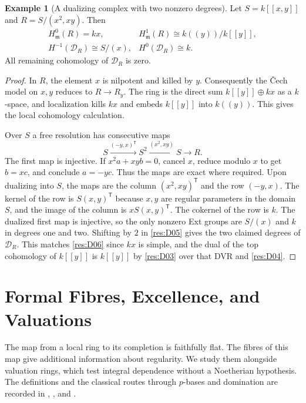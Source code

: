 \documentclass[11pt,oneside,openany]{book}
\theoremstyle{definition}
\newtheorem{example}[theorem]{Example}
\theoremstyle{remark}
\begin{document}
\begin{example}[A dualizing complex with two nonzero degrees]\label{res:E04}
Let $S=k[[x,y]]$ and $R=S/(x^2,xy)$. Then
\[
 \begin{array}{ll}
 H^0_{\mathfrak m}(R)=kx, &
 H^1_{\mathfrak m}(R)\cong k((y))/k[[y]],\\[2pt]
 H^{-1}(\mathcal D_R)\cong S/(x), &
 H^0(\mathcal D_R)\cong k .
 \end{array}
\]
All remaining cohomology of $\mathcal D_R$ is zero.
\end{example}
\begin{proof}
In $R$, the element $x$ is nilpotent and killed by $y$.
Consequently the \v{C}ech model on $x,y$ reduces to $R\to R_y$.
The ring is the direct sum $k[[y]]\oplus kx$ as a $k$-space,
and localization kills $kx$ and embeds $k[[y]]$ into $k((y))$.
This gives the local cohomology calculation.

Over $S$ a free resolution has consecutive maps
\[
        S\xrightarrow{(-y,x)^{\mathsf T}} S^2
          \xrightarrow{(x^2,xy)} S \longrightarrow R .
\]
The first map is injective. If $x^2a+xyb=0$, cancel $x$, reduce
modulo $x$ to get $b=xc$, and conclude $a=-yc$. Thus the maps
are exact where required. Upon dualizing into $S$, the maps
are the column $(x^2,xy)^{\mathsf T}$ and the row $(-y,x)$.
The kernel of the row is $S(x,y)^{\mathsf T}$ because $x,y$
are regular parameters in the domain $S$, and the image of
the column is $x S(x,y)^{\mathsf T}$. The cokernel of the row
is $k$. The dualized first map is injective, so the only nonzero
Ext groups are $S/(x)$ and $k$ in degrees one and two.
Shifting by $2$ in \ref{res:D05} gives the two claimed degrees
of $\mathcal D_R$. This matches \ref{res:D06} since $kx$ is simple,
and the dual of the top cohomology of $k[[y]]$ is $k[[y]]$
by \ref{res:D03} over that DVR and \ref{res:D04}.
\end{proof}
\chapter[Excellence and Valuations]{Formal Fibres, Excellence, and Valuations}
\label{ch:excellence-valuations}

The map from a local ring to its completion is faithfully flat. The fibres of this map give additional information about regularity. We study them alongside valuation rings, which test integral dependence without a Noetherian hypothesis. The definitions and the classical routes through \(p\)-bases and domination are recorded in \cite[Sections 47--53 and 125]{st-more}, \cite[Section 50]{st-alg}, and \cite[Section 32]{matsumura}.
\end{document}

